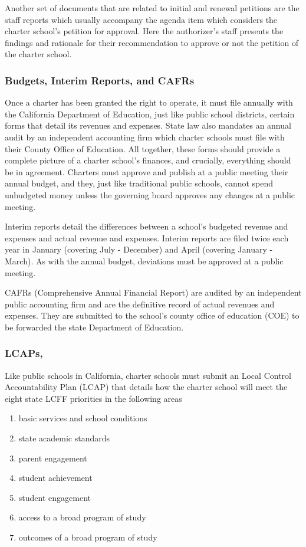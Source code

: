 Another set of documents that are related to initial and renewal petitions are the staff reports which usually accompany the agenda item which considers the charter school's petition for approval. Here the authorizer's staff presents the findings and rationale for their recommendation to approve or not the petition of the charter school.

\subsubsection{Budgets,  Interim Reports, and CAFRs}\label{sec:budgets-etc}\indent

Once a charter has been granted the right to operate, it must file annually with the California Department of Education, just like public school districts, certain forms that detail its revenues and expenses. State law also mandates an annual audit by an independent accounting firm which charter schools must file with their County Office of Education. All together, these forms should provide a complete picture of a charter school's finances, and crucially, everything should be in agreement. Charters must approve and publish at a public meeting their annual budget, and they, just like traditional public schools, cannot spend unbudgeted money unless the governing board approves any changes at a public meeting.

Interim reports detail the differences between a school's budgeted revenue and expenses and actual revenue and expenses. Interim reports are filed twice each year in January (covering July - December) and April (covering January - March). As with the annual budget, deviations must be approved at a public meeting.

CAFRs (Comprehensive Annual Financial Report) are audited by an independent public accounting firm and are the definitive record of actual revenues and expenses. They are submitted to the school's county office of education (COE) to be forwarded the state Department of Education.

\subsubsection{LCAPs,}\label{sec:cs-lcaps}\indent

Like public schools in California, charter schools must submit an Local Control Accountability Plan (LCAP) that details how the charter school will meet the eight state LCFF priorities in the following areas
\begin{enumerate}
  \item basic services and school conditions
  \item state academic standards
  \item parent engagement
  \item student achievement
  \item student engagement
  \item access to a broad program of study
  \item outcomes of a broad program of study
\end{enumerate}

